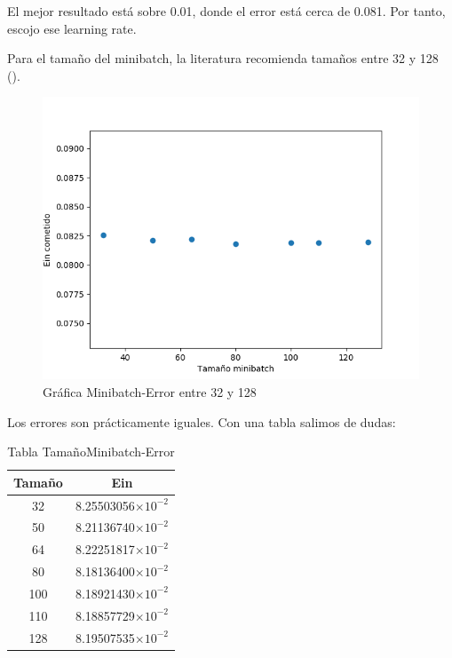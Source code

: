 El mejor resultado está sobre  0.01, donde el error está cerca de 0.081. Por tanto, escojo ese learning rate.

Para el tamaño del minibatch, la literatura recomienda tamaños entre 32 y 128 (\cite{lfd}).


\begin{figure}[H] %
	\centering
	\includegraphics[scale=0.6]{minibatch.png}  %
	\caption{Gráfica Minibatch-Error entre 32 y 128} 
	\label{fig:mb}
\end{figure}

Los errores son prácticamente iguales. Con una tabla salimos de dudas:

\begin{table}[H]
	\centering
	\begin{tabular}{|c|c|}
		\hline
		Tamaño & Ein            \\ \hline
		32     & 8.25503056$\times 10^{-2}$ \\ \hline
		50     & 8.21136740$\times 10^{-2}$ \\ \hline
		64     & 8.22251817$\times 10^{-2}$ \\ \hline
		80     & 8.18136400$\times 10^{-2}$ \\ \hline
		100    & 8.18921430$\times 10^{-2}$ \\ \hline
		110    & 8.18857729$\times 10^{-2}$ \\ \hline
		128    & 8.19507535$\times 10^{-2}$ \\ \hline
	\end{tabular}
	\caption{Tabla TamañoMinibatch-Error}
	\label{table2}
\end{table}

